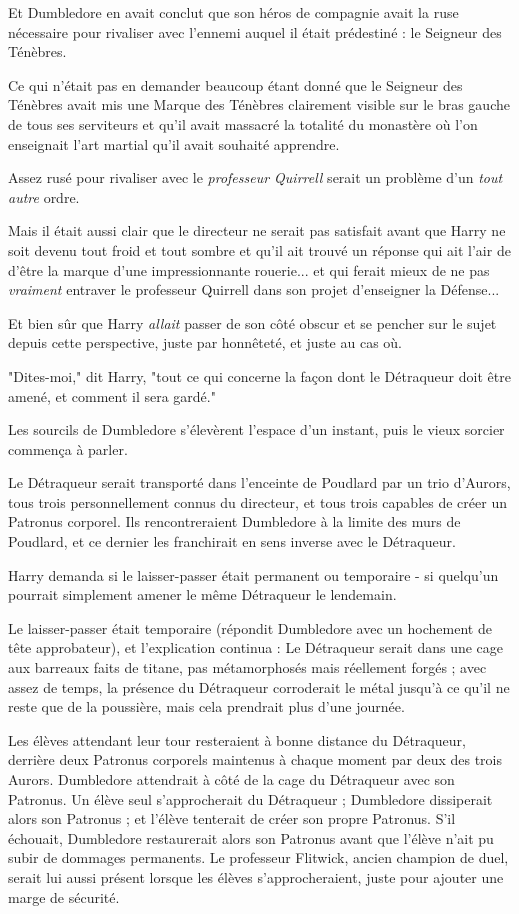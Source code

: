 Et Dumbledore en avait conclut que son héros de compagnie avait la ruse nécessaire pour rivaliser avec l'ennemi auquel il était prédestiné : le Seigneur des Ténèbres.

Ce qui n'était pas en demander beaucoup étant donné que le Seigneur des Ténèbres avait mis une Marque des Ténèbres clairement visible sur le bras gauche de tous ses serviteurs et qu'il avait massacré la totalité du monastère où l'on enseignait l'art martial qu'il avait souhaité apprendre.

Assez rusé pour rivaliser avec le \emph{professeur Quirrell}  serait un problème d'un \emph{tout}  \emph{autre}  ordre.

Mais il était aussi clair que le directeur ne serait pas satisfait avant que Harry ne soit devenu tout froid et tout sombre et qu'il ait trouvé un réponse qui ait l'air de d'être la marque d'une impressionnante rouerie... et qui ferait mieux de ne pas \emph{vraiment}  entraver le professeur Quirrell dans son projet d'enseigner la Défense...

Et bien sûr que Harry \emph{allait}  passer de son côté obscur et se pencher sur le sujet depuis cette perspective, juste par honnêteté, et juste au cas où.

"Dites-moi," dit Harry, "tout ce qui concerne la façon dont le Détraqueur doit être amené, et comment il sera gardé."

Les sourcils de Dumbledore s'élevèrent l'espace d'un instant, puis le vieux sorcier commença à parler.

Le Détraqueur serait transporté dans l'enceinte de Poudlard par un trio d'Aurors, tous trois personnellement connus du directeur, et tous trois capables de créer un Patronus corporel. Ils rencontreraient Dumbledore à la limite des murs de Poudlard, et ce dernier les franchirait en sens inverse avec le Détraqueur.

Harry demanda si le laisser-passer était permanent ou temporaire - si quelqu'un pourrait simplement amener le même Détraqueur le lendemain.

Le laisser-passer était temporaire (répondit Dumbledore avec un hochement de tête approbateur), et l'explication continua : Le Détraqueur serait dans une cage aux barreaux faits de titane, pas métamorphosés mais réellement forgés ; avec assez de temps, la présence du Détraqueur corroderait le métal jusqu'à ce qu'il ne reste que de la poussière, mais cela prendrait plus d'une journée.

Les élèves attendant leur tour resteraient à bonne distance du Détraqueur, derrière deux Patronus corporels maintenus à chaque moment par deux des trois Aurors. Dumbledore attendrait à côté de la cage du Détraqueur avec son Patronus. Un élève seul s'approcherait du Détraqueur ; Dumbledore dissiperait alors son Patronus ; et l'élève tenterait de créer son propre Patronus. S'il échouait, Dumbledore restaurerait alors son Patronus avant que l'élève n'ait pu subir de dommages permanents. Le professeur Flitwick, ancien champion de duel, serait lui aussi présent lorsque les élèves s'approcheraient, juste pour ajouter une marge de sécurité.

